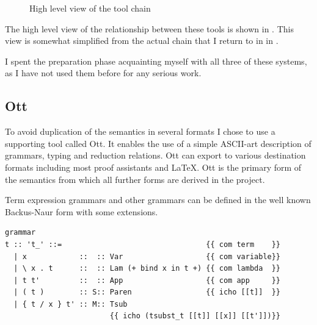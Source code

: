 \documentclass[12pt,twoside,notitlepage]{report}
\theoremstyle{plain}%
\theoremstyle{definition}
\theoremstyle{remark}
\begin{document}
\begin{figure}[H]
\centering
{}
\caption{High level view of the tool chain}
\label{fig:simpl_toolchain}
\end{figure}

The high level view of the relationship between these tools is shown in . This view is somewhat simplified from the actual chain that I return to in  in .

I spent the preparation phase acquainting myself with all three of these systems, as I have not used them before for any serious work.
\subsection{Ott}
To avoid duplication of the semantics in several formats I chose to use a supporting tool called Ott\cite{Ott}. It enables the use of a simple ASCII-art description of grammars, typing and reduction relations. Ott can export to various destination formats including most proof assistants and \LaTeX. Ott  is the primary form of the semantics from which all further forms are derived in the project.

Term expression grammars and other grammars can be defined in the well known Backus-Naur form with some extensions. \vspace{5mm}

\begin{minipage}{\linewidth}
\begin{lstlisting}[language={Ott}, caption={Ott grammar example}, label={lst:ottgrammarex}]
grammar
t :: 't_' ::=                                 {{ com term    }}
  | x            ::  :: Var                   {{ com variable}}
  | \ x . t      ::  :: Lam (+ bind x in t +) {{ com lambda  }}
  | t t'         ::  :: App                   {{ com app     }}
  | ( t )        :: S:: Paren                 {{ icho [[t]]  }} 
  | { t / x } t' :: M:: Tsub  
                        {{ icho (tsubst_t [[t]] [[x]] [[t']])}}
\end{lstlisting}
\end{minipage}
\end{document}
